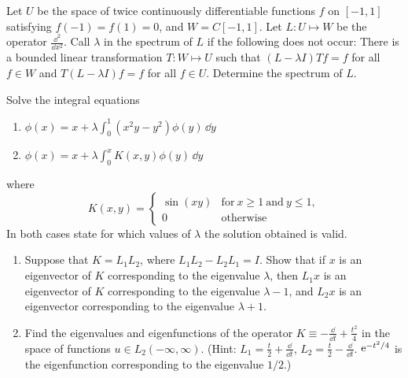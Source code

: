 \begin{Exercise}
  Let $U$ be the space of twice continuously differentiable functions $f$ on
  $[-1,1]$ satisfying $f(-1) = f(1) = 0$, and $W = C[-1,1]$.  Let
  $L : U \mapsto W$ be the operator $\frac{\dd^2}{\dd x^2}$.  Call $\lambda$ in the 
  spectrum of $L$ if the following does not occur:  There is a bounded
  linear transformation $T : W \mapsto U$ such that $(L - \lambda I) T f = f$
  for all $f \in W$ and $T (L - \lambda I) f = f$ for all $f \in U$.  
  Determine the spectrum of $L$.
\end{Exercise}



\begin{Exercise}
  Solve the integral equations
  \begin{enumerate}
  \item
    $ \displaystyle
    \phi(x) = x + \lambda \int_0^1 \left( x^2 y - y^2 \right) \phi(y) \,\dd y
    $
  \item
    $ \displaystyle
    \phi(x) = x + \lambda \int_0^x K(x,y) \phi(y) \,\dd y
    $
  \end{enumerate}
  where
  \[
  K(x,y) = 
  \begin{cases}
    \sin(x y) &\mathrm{for}\ x \geq 1 \ \mathrm{and}\ y \leq 1, \\
    0 &\mathrm{otherwise}
  \end{cases}
  \]
  In both cases state for which values of $\lambda$ the solution obtained
  is valid.
\end{Exercise}



\begin{Exercise}
  \begin{enumerate}
  \item
    Suppose that $K = L_1 L_2$, where $L_1 L_2 - L_2 L_1 = I$.  Show that if $x$
    is an eigenvector of $K$ corresponding to the eigenvalue $\lambda$, then
    $L_1 x$ is an eigenvector of $K$ corresponding to the eigenvalue
    $\lambda - 1$, and $L_2 x$ is an eigenvector corresponding to the eigenvalue
    $\lambda + 1$.
  \item
    Find the eigenvalues and eigenfunctions of the operator 
    $K \equiv - \frac{\dd}{\dd t} + \frac{t^2}{4}$ in the space of functions
    $u \in L_2(-\infty,\infty)$. (Hint: $L_1 = \frac{t}{2} + \frac{\dd}{\dd t}$,
    $L_2 = \frac{t}{2} - \frac{\dd}{\dd t}$.  $\mathop{\mathrm{e}}\nolimits^{-t^2/4}$ is the eigenfunction
    corresponding to the eigenvalue $1/2$.)
  \end{enumerate}
\end{Exercise}



